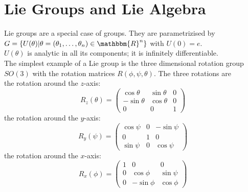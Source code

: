 \documentclass{include/thesisclass}
\newcommand{\Mat}[9]{\begin{pmatrix}#1&#2&#3\\#4&#5&#6\\#7&#8&#9\end{pmatrix}}
\begin{document}
\section{Lie Groups and Lie Algebra}
Lie groups are a special case of groups. They are parametrizised by $G = \{ U(\theta)| \theta = ( \theta_1, \ldots, \theta_n) \in \mathbbm{R}^n\}$ with $U(0) = e$. \\
$U(\theta)$ is analytic in all its components; it is infinitely differentiable.\\
The simplest example of a Lie group is the three dimensional rotation group $SO(3)$ with the rotation matrices $R(\phi,\psi,\theta)$. The three rotations are\\
the rotation around the $z$-axis:
\[ R_z(\theta) = \Mat{\cos\theta}{\sin\theta}{0}{- \sin\theta}{\cos\theta}{0}{0}{0}{1}\]
the rotation around the $y$-axis:
\[ R_y(\psi) = \Mat{\cos\psi}{0}{-\sin\psi}{0}{1}{0}{\sin\psi}{0}{\cos\psi}\]
the rotation around the $x$-axis:
\[ R_x(\phi) = \Mat{1}{0}{0}{0}{\cos\phi}{\sin\psi}{0}{-\sin\phi}{\cos\phi}\]
\end{document}
